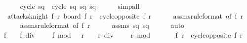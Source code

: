 \begin{isabellebody}
\ \ \ \ \isamarkupfalse%
\ {\isacharbackquoteopen}cycle\ sq{}\ {\isacharequal}\ cycle\ sq{}{\isacharbackquoteclose}\ sq{}\ sq{}\isanewline
\ \ \ \ \isamarkupfalse%
\ simp{\isacharunderscore}all\isanewline
\isanewline
\ \ \isamarkupfalse%
\ {\isachardoublequoteopen}{\isasymnot}\ attacks{\isacharunderscore}knight\ {\isacharparenleft}f{}{\isacharcomma}\ r{}{\isacharparenright}\ board{\isachardoublequoteclose}\ {\isachardoublequoteopen}{\isacharparenleft}f{}{\isacharcomma}\ r{}{\isacharparenright}\ {\isasymnoteq}\ cycle{\isacharunderscore}opposite\ {\isacharparenleft}f{}{\isacharcomma}\ r{}{\isacharparenright}{\isachardoublequoteclose}\isanewline
\ \ \ \ \isamarkupfalse%
\ assms{\isacharparenleft}{}{\isacharparenright}{\isacharbrackleft}rule{\isacharunderscore}format{\isacharcomma}\ of\ {\isachardoublequoteopen}{\isacharparenleft}f{}{\isacharcomma}\ r{}{\isacharparenright}{\isachardoublequoteclose}{\isacharbrackright}\ \isanewline
\ \ \ \ \isamarkupfalse%
\ assms{\isacharparenleft}{}{\isacharparenright}{\isacharbrackleft}rule{\isacharunderscore}format{\isacharcomma}\ of\ {\isachardoublequoteopen}{\isacharparenleft}f{}{\isacharcomma}\ r{}{\isacharparenright}{\isachardoublequoteclose}{\isacharbrackright}\isanewline
\ \ \ \ \isamarkupfalse%
\ assms{\isacharparenleft}{}{\isacharminus}{}{\isacharparenright}\ sq{}\ sq{}\isanewline
\ \ \ \ \isamarkupfalse%
\ auto\isanewline
\ \ \isanewline
\ \ \isamarkupfalse%
\ {\isachardoublequoteopen}f{}\ {\isasymnoteq}\ {}\ {\isacharasterisk}\ {\isacharparenleft}f{}\ div\ {}{\isacharparenright}\ {\isacharplus}\ {\isacharparenleft}{}\ {\isacharminus}\ f{}\ mod\ {}{\isacharparenright}\ {\isasymor}\ r{}\ {\isasymnoteq}\ {}\ {\isacharasterisk}\ {\isacharparenleft}r{}\ div\ {}{\isacharparenright}\ {\isacharplus}\ {\isacharparenleft}{}\ {\isacharminus}\ r{}\ mod\ {}{\isacharparenright}{\isachardoublequoteclose}\isanewline
\ \ \ \ \isamarkupfalse%
\ {\isacharbackquoteopen}{\isacharparenleft}f{}{\isacharcomma}\ r{}{\isacharparenright}\ {\isasymnoteq}\ cycle{\isacharunderscore}opposite\ {\isacharparenleft}f{}{\isacharcomma}\ r{}{\isacharparenright}{\isacharbackquoteclose}\isanewline

\end{isabellebody}

